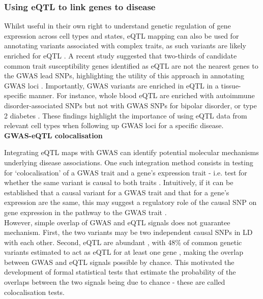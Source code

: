 \newpage

\subsubsection{Using eQTL to link genes to disease}

Whilst useful in their own right to understand genetic regulation of gene expression across cell types and states, eQTL mapping can also be used for annotating variants associated with complex traits, as such variants are likely enriched for eQTL \cite{nicolae2010trait}. 
A recent study suggested that two-thirds of candidate common trait susceptibility genes identified as eQTL are not the nearest genes to the GWAS lead SNPs, highlighting the utility of this approach in annotating GWAS loci \cite{zhu2016integration}. 
Importantly, GWAS variants are enriched in eQTL in a tissue-specific manner. 
For instance, whole blood eQTL are enriched with autoimmune disorder-associated SNPs but not with GWAS SNPs for bipolar disorder, or type 2 diabetes \cite{gtex2015genotype}. 
These findings highlight the importance of using eQTL data from relevant cell types when following up GWAS loci for a specific disease.\\

\textbf{GWAS-eQTL colocalisation}

Integrating eQTL maps with GWAS can identify potential molecular mechanisms underlying disease associations.
One such integration method consists in testing for `colocalisation' of a GWAS trait and a gene’s expression trait - i.e. test for whether the same variant is causal to both traits \cite{cannon2018deciphering}.
Intuitively, if it can be established that a causal variant for a GWAS trait and that for a gene’s expression are the same, this may suggest a regulatory role of the causal SNP on gene expression in the pathway to the GWAS trait \cite{he2013sherlock, ongen2017estimating}. \\

However, simple overlap of GWAS and eQTL signals does not guarantee mechanism. 
First, the two variants may be two independent causal SNPs in LD with each other.
Second, eQTL are abundant \cite{lappalainen2013transcriptome}, with 48\% of common genetic variants estimated to act as eQTL for at least one gene \cite{liu2019abundant}, making the overlap between GWAS and eQTL signals possible by chance.
This motivated the development of formal statistical tests that estimate the probability of the overlaps between the two signals being due to chance - these are called colocalisation tests. \\

